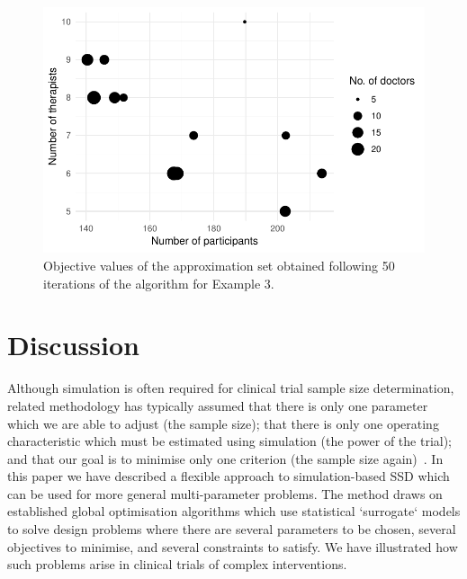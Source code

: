 \documentclass[]{sagej}
\begin{document}
\begin{figure}
\centering
\includegraphics[scale=0.8]{./Figures/ex3_single_run}
\caption{Objective values of the approximation set obtained following 50 iterations of the algorithm for Example 3.}
\label{fig:ex3_single_run}
\end{figure}

\section{Discussion}\label{sec:discussion}

Although simulation is often required for clinical trial sample size determination, related methodology has typically assumed that there is only one parameter which we are able to adjust (the sample size); that there is only one operating characteristic which must be estimated using simulation (the power of the trial); and that our goal is to minimise only one criterion (the sample size again)~\cite{Landau2013, Hooper2013}. In this paper we have described a flexible approach to simulation-based SSD which can be used for more general multi-parameter problems. The method draws on established global optimisation algorithms which use statistical `surrogate` models to solve design problems where there are several parameters to be chosen, several objectives to minimise, and several constraints to satisfy. We have illustrated how such problems arise in clinical trials of complex interventions.
\end{document}

